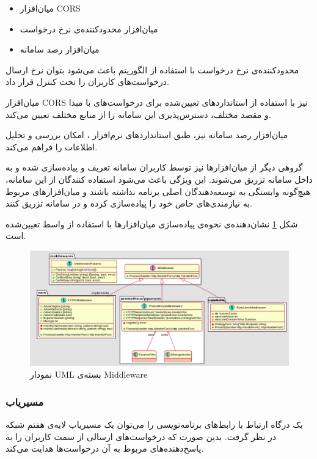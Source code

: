 \begin{itemize}
    \item میان‌افزار CORS
    \item میان‌افزار محدود‌کننده‌ی نرخ درخواست 
    \item میان‌افزار رصد سامانه
\end{itemize}

محدود‌کننده‌ی نرخ درخواست با استفاده از الگوریتم 
\cite{tokenbucket}
باعث می‌شود بتوان نرخ ارسال درخواست‌های کاربران را تحت کنترل قرار داد.

میان‌افزار CORS
\cite{cors}
نیز با استفاده از استاندارد‌های تعیین‌شده برای درخواست‌های با مبدا و مقصد مختلف، دسترس‌پذیری این سامانه‌ را از منابع مختلف تعیین می‌کند.

میان‌افزار رصد سامانه نیز، طبق استاندارد‌های نرم‌افزار ،
\cite{prometheus}
امکان بررسی و تحلیل اطلاعات را فراهم می‌کند.

گروهی دیگر از میان‌افزار‌ها نیز توسط کاربران سامانه تعریف و پیاده‌سازی شده و به داخل سامانه تزریق می‌شوند. این ویژگی باعث می‌شود استفاده کنندگان از این سامانه، هیچ‌گونه وابستگی به توسعه‌دهندگان اصلی برنامه نداشته باشند و میان‌افزار‌های مربوط‌ به نیازمندی‌های خاص خود را پیاده‌سازی کرده و در سامانه تزریق کنند.

شکل
\ref{middlewares_package}
نشان‌دهنده‌ی نحوه‌ی پیاده‌سازی میان‌افزار‌ها با استفاده از واسط تعیین‌شده است.

\begin{figure}[H]
    \centering
    \label{middlewares_package}
    \includegraphics[scale=0.2]{images/Middleware.png}
    \caption{نمودار UML بسته‌ی Middleware}
\end{figure}

\subsubsection{مسیریاب}\label{subsec:impl_router}
یک درگاه ارتباط با رابط‌های برنامه‌نویسی را می‌توان یک مسیریاب لایه‌ی هفتم شبکه در نظر گرفت. بدین صورت که درخواست‌های ارسالی از سمت کاربران را به پاسخ‌دهنده‌های مربوط به آن‌ درخواست‌ها هدایت می‌کند.

